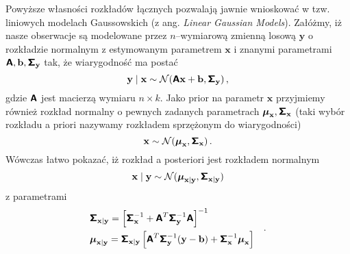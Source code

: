 \documentclass{myclass}
\begin{document}
Powyższe własności rozkładów łącznych pozwalają jawnie wnioskować w tzw. liniowych modelach
Gaussowskich (z ang. \textit{Linear Gaussian Models}). Załóżmy, iż nasze obserwacje są modelowane
przez \(n\)--wymiarową zmienną losową \(\mathbf{y}\) o rozkładzie normalnym z estymowanym parametrem
\(\mathbf{x}\) i znanymi parametrami \(\boldsymbol{\mathsf{A}}, \mathbf{b}, \boldsymbol{\mathsf{\Sigma}}_\mathbf{y}\) tak, że
wiarygodność ma postać
\begin{equation*}
    \mathbf{y}\mid\mathbf{x} \sim \mathcal{N}(\boldsymbol{\mathsf{A}}\mathbf{x} + \mathbf{b}, \boldsymbol{\mathsf{\Sigma}}_\mathbf{y})\,,
\end{equation*}
gdzie \(\boldsymbol{\mathsf{A}}\) jest macierzą wymiaru \(n\times k\). Jako prior na parametr \(\mathbf{x}\)
przyjmiemy również rozkład normalny o pewnych zadanych parametrach \(\boldsymbol{\mu}_\mathbf{x},
\boldsymbol{\mathsf{\Sigma}}_\mathbf{x}\) (taki wybór rozkładu a priori nazywamy rozkładem sprzężonym do
wiarygodności)
\begin{equation*}
    \mathbf{x} \sim \mathcal{N}(\boldsymbol{\mu}_\mathbf{x}, \boldsymbol{\mathsf{\Sigma}}_\mathbf{x})\,.
\end{equation*}
Wówczas łatwo pokazać, iż rozkład a posteriori jest rozkładem normalnym
\begin{equation*}
    \mathbf{x} \mid \mathbf{y} \sim \mathcal{N}(\boldsymbol{\mu}_{\mathbf{x}|\mathbf{y}}, \boldsymbol{\mathsf{\Sigma}}_{\mathbf{x}|\mathbf{y}})
\end{equation*}
z parametrami
\begin{equation*}
    \begin{split}
        &\boldsymbol{\mathsf{\Sigma}}_{\mathbf{x}|\mathbf{y}} = \left[\boldsymbol{\mathsf{\Sigma}}_\mathbf{x}^{-1} + \boldsymbol{\mathsf{A}}^T\boldsymbol{\mathsf{\Sigma}}_\mathbf{y}^{-1}\boldsymbol{\mathsf{A}}\right]^{-1}\\
        &\boldsymbol{\mu}_{\mathbf{x}|\mathbf{y}} = \boldsymbol{\mathsf{\Sigma}}_{\mathbf{x}|\mathbf{y}}\left[\boldsymbol{\mathsf{A}}^T\boldsymbol{\mathsf{\Sigma}}_\mathbf{y}^{-1}(\mathbf{y} - \mathbf{b}) + \boldsymbol{\mathsf{\Sigma}}_\mathbf{x}^{-1}\boldsymbol{\mu}_\mathbf{x}\right]
    \end{split}\quad.
\end{equation*}
\end{document}
